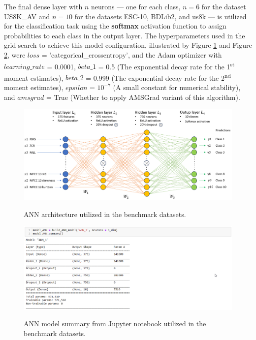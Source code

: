 The final dense layer with $n$ neurons — one for each class, $n=6$ for the dataset US8K\_AV and $n=10$ for the datasets ESC-10, BDLib2, and \gls{us8k} — is utilized for the classification task using the \textbf{softmax} activation function to assign probabilities to each class in the output layer. The hyperparameters used in the grid search to achieve this model configuration, illustrated by Figure \ref{fig:methods_training_ANN_architecture} and Figure \ref{fig:methods_training_ANN_architecture_jupyter_notebook}, were $loss$ = 'categorical\_crossentropy', and the Adam optimizer with $learning\_rate$ = 0.0001, $beta\_1$ = 0.5 (The exponential decay rate for the 1\textsuperscript{st} moment estimates), $beta\_2$ = 0.999 (The exponential decay rate for the 2\textsuperscript{nd} moment estimates), $epsilon$ = $10^{-7}$ (A small constant for numerical stability), and $amsgrad$ = True (Whether to apply AMSGrad variant \cite{Reddi2018} of this algorithm). 


\begin{figure}[htbp]
    \raggedright
        \caption{ANN architecture utilized in the benchmark datasets.}
        \includegraphics[width=1\textwidth]{resources/images/050-methods/Methods_training_ANN_architecture.png}
        \label{fig:methods_training_ANN_architecture}
\end{figure} 


\begin{figure}[htbp]
    \raggedright
        \caption{ANN model summary from Jupyter notebook utilized in the benchmark datasets.}
        \includegraphics[width=1\textwidth]{resources/images/050-methods/Methods_training_ANN_architecture_jupyter_notebook.png}
        \label{fig:methods_training_ANN_architecture_jupyter_notebook}
\end{figure} 


